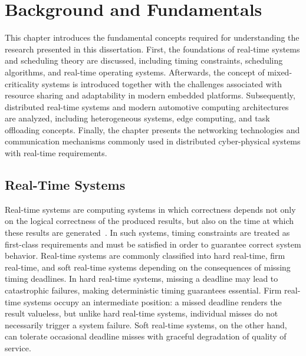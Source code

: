 \chapter{Background and Fundamentals}
\label{chap:background}

This chapter introduces the fundamental concepts required for
understanding the research presented in this dissertation.
First, the foundations of real-time systems and scheduling
theory are discussed, including timing constraints, scheduling
algorithms, and real-time operating systems. Afterwards, the
concept of mixed-criticality systems is introduced together
with the challenges associated with resource sharing and
adaptability in modern embedded platforms.
Subsequently, distributed real-time systems and modern
automotive computing architectures are analyzed, including
heterogeneous systems, edge computing, and task offloading
concepts. Finally, the chapter presents the networking
technologies and communication mechanisms commonly used in
distributed cyber-physical systems with real-time requirements.

\section{Real-Time Systems}
\label{sec:rtsystems}

Real-time systems are computing systems in which correctness
depends not only on the logical correctness of the produced
results, but also on the time at which these results are
generated~\cite{buttazzo2011}. In such systems, timing
constraints are treated as first-class requirements and must
be satisfied in order to guarantee correct system behavior.
Real-time systems are commonly classified into hard real-time,
firm real-time, and soft real-time systems depending on the
consequences of missing timing deadlines. In hard real-time
systems, missing a deadline may lead to catastrophic failures,
making deterministic timing guarantees essential. Firm
real-time systems occupy an intermediate position: a missed
deadline renders the result valueless, but unlike hard
real-time systems, individual misses do not necessarily
trigger a system failure. Soft real-time systems, on the other
hand, can tolerate occasional deadline misses with graceful
degradation of quality of service.


